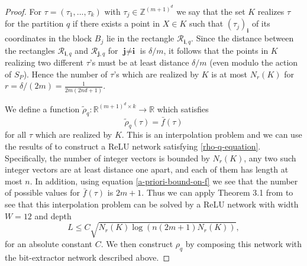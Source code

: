 \documentclass[twoside,11pt]{article}
\begin{document}
\begin{proof}
        For $\tau = (\tau_1,...,\tau_k)$ with $\tau_j\in \mathbb{Z}^{(m+1)^d}$ we say that the set $K$ realizes $\tau$ for the partition $q$ if there exists a point in $X\in K$ such that $(\tau_j)_{\textbf{i}}$ of its coordinates in the block $B_j$ lie in the rectangle $\mathcal{R}_{\textbf{i},q}$. Since the distance between the rectangles $\mathcal{R}_{\textbf{i},q}$ and $\mathcal{R}_{\textbf{j},q}$ for $\textbf{j}\neq \textbf{i}$ is $\delta/m$, it follows that the points in $K$ realizing two different $\tau$'s must be at least distance $\delta/m$ (even modulo the action of $S_P$). Hence the number of $\tau$'s which are realized by $K$ is at most $N_r(K)$ for $r = \delta / (2m) = \frac{1}{2m(2nd+1)}$.
        
        We define a function $\tilde{\rho}_q: \mathbb{R}^{(m+1)^d\times k}\rightarrow \mathbb{R}$ which satisfies
        \begin{equation}\label{rho-q-equation}
            \tilde{\rho}_q(\tau) = \bar{f}(\tau)
        \end{equation}
        for all $\tau$ which are realized by $K$. This is an interpolation problem and we can use the results of
        \cite{vardi2022on} to construct a ReLU network satisfying \eqref{rho-q-equation}. Specifically, the number of integer vectors is bounded by $N_r(K)$,
        any two such integer vectors are at least distance one apart, and each of them has length at most $n$. In addition, using equation \eqref{a-priori-bound-on-f} we see that the number of possible values for $\bar{f}(\tau)$ is $2m+1$. Thus we can apply Theorem 3.1 from \cite{vardi2022on} to see that this interpolation problem can be solved by a ReLU network with width $W = 12$ and depth
        \begin{equation}\label{depth-bound-on-L}
            L\leq C\sqrt{N_r(K)\log(n(2m+1)N_r(K))},
        \end{equation}
        for an absolute constant $C$. We then construct $\rho_q$ by composing this network with the bit-extractor network described above. 
        

\end{proof}
\end{document}

